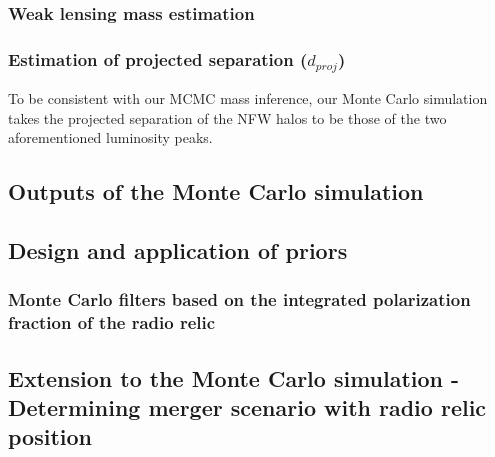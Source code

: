 \subsubsection{Weak lensing mass estimation} 



\subsubsection{Estimation of projected separation ($d_{proj}$) } 
To be consistent with our MCMC mass inference, our Monte Carlo simulation takes 
the projected separation of the NFW halos to be those of the two aforementioned 
luminosity peaks.

\subsection{Outputs of the Monte Carlo simulation}
\label{sec: outputs}


\subsection{Design and application of priors} 
\label{sec:priors}


\subsubsection{Monte Carlo filters based on the integrated polarization fraction of the radio relic}


\subsection{Extension to the Monte Carlo simulation - Determining merger scenario with radio relic position}
\label{sec: positionprior}


